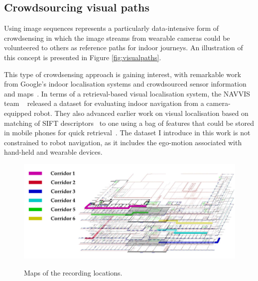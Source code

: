 \subsection{Crowdsourcing visual paths}
\label{subsec:visual_paths}

Using image sequences represents a particularly data-intensive form of crowdsensing in which the image streams  from wearable cameras could be volunteered to others as reference paths for indoor journeys. An illustration of this concept is presented in Figure \ref{fig:visualpaths}. 

This type of crowdsensing approach is gaining interest, with remarkable work from Google's indoor localisation systems and crowdsourced sensor information and maps~\cite{Kadous2013}. In terms of a retrieval-based visual localisation system, the NAVVIS team ~\cite{Huitl2012} released a dataset for evaluating indoor navigation from a camera-equipped robot. They also advanced earlier work on visual localisation based on matching of SIFT descriptors~\cite{Park2008} to one using a bag of features that could be stored in mobile phones for quick retrieval~\cite{Schroth2011,Schroth2012}. The dataset I introduce in this work is not constrained to robot navigation, as it includes the ego-motion associated with hand-held and wearable devices.

\begin{figure}[t]
\includegraphics[width=\linewidth]{./gfx/Chapter04/map_and_legend.pdf}\label{fig:visualpathsA}
\caption{Maps of the recording locations.}
\label{fig:map_and_legend}
\end{figure}


